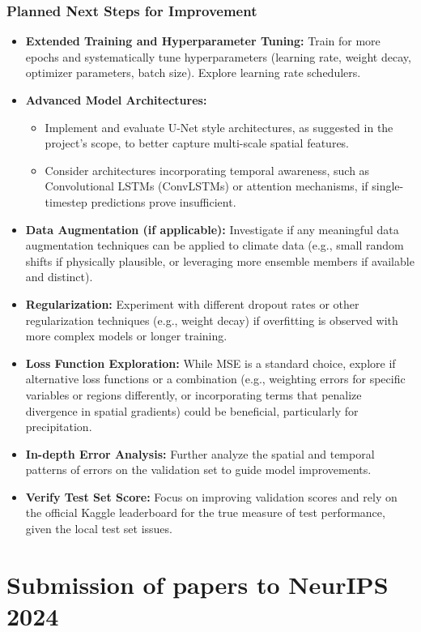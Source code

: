 \documentclass{article}
\begin{document}
\subsubsection{Planned Next Steps for Improvement}
\begin{itemize}
    \item \textbf{Extended Training and Hyperparameter Tuning:} Train for more epochs and systematically tune hyperparameters (learning rate, weight decay, optimizer parameters, batch size). Explore learning rate schedulers.
    \item \textbf{Advanced Model Architectures:}
    \begin{itemize}
        \item Implement and evaluate U-Net style architectures, as suggested in the project's scope, to better capture multi-scale spatial features.
        \item Consider architectures incorporating temporal awareness, such as Convolutional LSTMs (ConvLSTMs) or attention mechanisms, if single-timestep predictions prove insufficient.
    \end{itemize}
    \item \textbf{Data Augmentation (if applicable):} Investigate if any meaningful data augmentation techniques can be applied to climate data (e.g., small random shifts if physically plausible, or leveraging more ensemble members if available and distinct).
    \item \textbf{Regularization:} Experiment with different dropout rates or other regularization techniques (e.g., weight decay) if overfitting is observed with more complex models or longer training.
    \item \textbf{Loss Function Exploration:} While MSE is a standard choice, explore if alternative loss functions or a combination (e.g., weighting errors for specific variables or regions differently, or incorporating terms that penalize divergence in spatial gradients) could be beneficial, particularly for precipitation.
    \item \textbf{In-depth Error Analysis:} Further analyze the spatial and temporal patterns of errors on the validation set to guide model improvements.
    \item \textbf{Verify Test Set Score:} Focus on improving validation scores and rely on the official Kaggle leaderboard for the true measure of test performance, given the local test set issues.
\end{itemize}

\section{Submission of papers to NeurIPS 2024}
\end{document}
